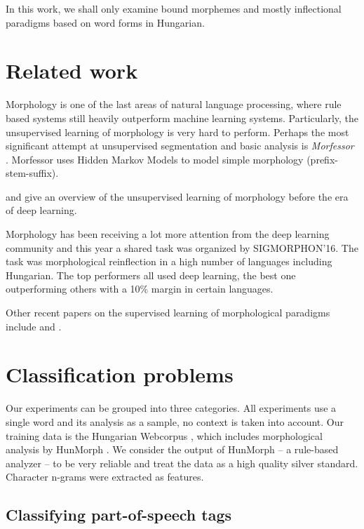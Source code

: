 \documentclass{article}
\begin{document}
In this work, we shall only examine bound morphemes and mostly inflectional paradigms based on word forms in Hungarian.


\section{Related work}\label{sec:related}

Morphology is one of the last areas of natural language processing, where rule based systems still heavily outperform machine learning systems.
Particularly, the unsupervised learning of morphology is very hard to perform.
Perhaps the most significant attempt at unsupervised segmentation and basic analysis is \emph{Morfessor} \cite{Creutz:2002, Creutz:2007}.
Morfessor uses Hidden Markov Models to model simple morphology (prefix-stem-suffix).

\cite{Goldsmith:2001} and \cite{Hammarstrom:2011} give an overview of the unsupervised learning of morphology before the era of deep learning.

Morphology has been receiving a lot more attention from the deep learning community and this year a shared task was organized by SIGMORPHON'16. \cite{Cotterell:2016}
The task was morphological reinflection in a high number of languages including Hungarian.
The top performers all used deep learning, the best one \citep{Kann:2016} outperforming others with a 10\% margin in certain languages.

Other recent papers on the supervised learning of morphological paradigms include \cite{Durrett:2013} and \cite{Ahlberg:2015}.

\section{Classification problems}\label{sec:classification}

Our experiments can be grouped into three categories.
All experiments use a single word and its analysis as a sample, no context is taken into account.
Our training data is the Hungarian Webcorpus \cite{Halacsy:2004}, which includes morphological analysis by HunMorph \cite{Tron:2005}.
We consider the output of HunMorph -- a rule-based analyzer -- to be very reliable and treat the data as a high quality silver standard.
Character n-grams were extracted as features.

\subsection{Classifying part-of-speech tags}
\end{document}
